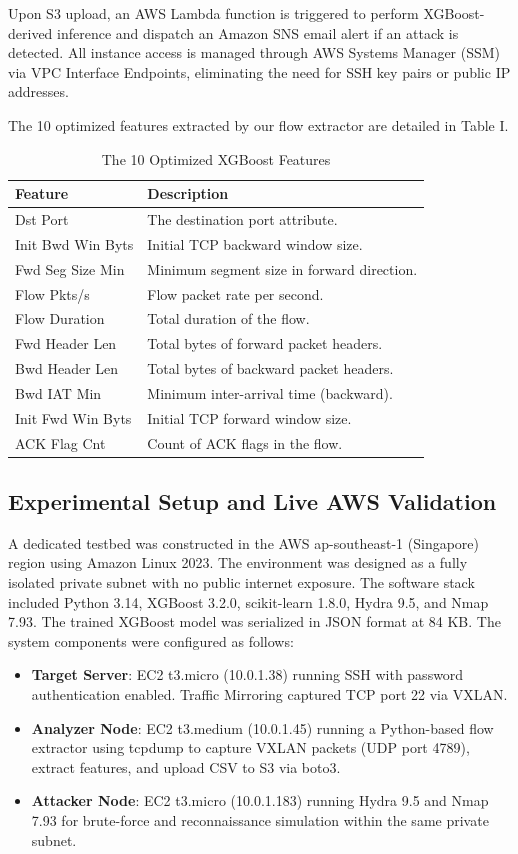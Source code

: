 \documentclass[conference]{IEEEtran}
\begin{document}
Upon S3 upload, an AWS Lambda function is triggered to perform XGBoost-derived inference and dispatch an Amazon SNS email alert if an attack is detected. All instance access is managed through AWS Systems Manager (SSM) via VPC Interface Endpoints, eliminating the need for SSH key pairs or public IP addresses.

The 10 optimized features extracted by our flow extractor are detailed in Table I.

\begin{table}[!ht]
\centering
\caption{The 10 Optimized XGBoost Features}
\footnotesize
\setlength{\tabcolsep}{3pt}
\begin{tabulary}{\linewidth}{|l|L|}
\hline
\textbf{Feature} & \textbf{Description} \\
\hline
Dst Port & The destination port attribute. \\
Init Bwd Win Byts & Initial TCP backward window size. \\
Fwd Seg Size Min & Minimum segment size in forward direction. \\
Flow Pkts/s & Flow packet rate per second. \\
Flow Duration & Total duration of the flow. \\
Fwd Header Len & Total bytes of forward packet headers. \\
Bwd Header Len & Total bytes of backward packet headers. \\
Bwd IAT Min & Minimum inter-arrival time (backward). \\
Init Fwd Win Byts & Initial TCP forward window size. \\
ACK Flag Cnt & Count of ACK flags in the flow. \\
\hline
\end{tabulary}
\end{table}

\subsection{Experimental Setup and Live AWS Validation}

A dedicated testbed was constructed in the AWS ap-southeast-1 (Singapore) region using Amazon Linux 2023. The environment was designed as a fully isolated private subnet with no public internet exposure. The software stack included Python 3.14, XGBoost 3.2.0, scikit-learn 1.8.0, Hydra 9.5, and Nmap 7.93. The trained XGBoost model was serialized in JSON format at 84 KB. The system components were configured as follows:
\begin{itemize}
\item \textbf{Target Server}: EC2 t3.micro (10.0.1.38) running SSH with password authentication enabled. Traffic Mirroring captured TCP port 22 via VXLAN.
\item \textbf{Analyzer Node}: EC2 t3.medium (10.0.1.45) running a Python-based flow extractor using tcpdump to capture VXLAN packets (UDP port 4789), extract features, and upload CSV to S3 via boto3.
\item \textbf{Attacker Node}: EC2 t3.micro (10.0.1.183) running Hydra 9.5 and Nmap 7.93 for brute-force and reconnaissance simulation within the same private subnet.
\end{itemize}
\end{document}
